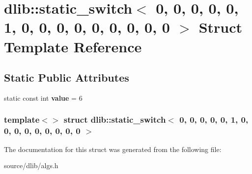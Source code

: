 \hypertarget{structdlib_1_1static__switch_3_010_00_010_00_010_00_010_00_010_00_011_00_010_00_010_00_010_00_01065a8f5a38c76e0fbec03f2ecf64307a}{
\section{dlib::static\_\-switch$<$ 0, 0, 0, 0, 0, 1, 0, 0, 0, 0, 0, 0, 0, 0, 0 $>$ Struct Template Reference}
\label{structdlib_1_1static__switch_3_010_00_010_00_010_00_010_00_010_00_011_00_010_00_010_00_010_00_01065a8f5a38c76e0fbec03f2ecf64307a}
}
\subsection*{Static Public Attributes}
\begin{DoxyCompactItemize}
\item 
\hypertarget{structdlib_1_1static__switch_3_010_00_010_00_010_00_010_00_010_00_011_00_010_00_010_00_010_00_01065a8f5a38c76e0fbec03f2ecf64307a_a2fb2a8c6459dda970b89f8160d7bf589}{
static const int {\bfseries value} = 6}
\label{structdlib_1_1static__switch_3_010_00_010_00_010_00_010_00_010_00_011_00_010_00_010_00_010_00_01065a8f5a38c76e0fbec03f2ecf64307a_a2fb2a8c6459dda970b89f8160d7bf589}

\end{DoxyCompactItemize}
\subsubsection*{template$<$$>$ struct dlib::static\_\-switch$<$ 0, 0, 0, 0, 0, 1, 0, 0, 0, 0, 0, 0, 0, 0, 0 $>$}



The documentation for this struct was generated from the following file:\begin{DoxyCompactItemize}
\item 
source/dlib/algs.h\end{DoxyCompactItemize}
